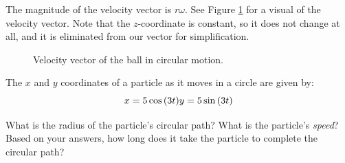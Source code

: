 The magnitude of the velocity vector is $r\omega$. See Figure \ref{fig:billardBallVelocity} for a visual of the velocity vector. Note that the $z$-coordinate is constant, so it does not change at all, and it is eliminated from our vector for simplification.
\begin{figure}[H]
  \begin{center}
  \end{center}
  \caption{Velocity vector of the ball in circular motion.}
  \label{fig:billardBallVelocity}
\end{figure}

\begin{Exercise} The $x$ and $y$ coordinates of a particle as it moves in a circle are given by:
  $$x = 5\cos{\left( 3t \right)}\\
    y = 5\sin{\left( 3t \right)}$$

  What is the radius of the particle's circular path? What is the particle's \textit{speed}? Based on your answers, how long does it take the particle to complete the circular path?
  \vspace{50mm}
\end{Exercise}

